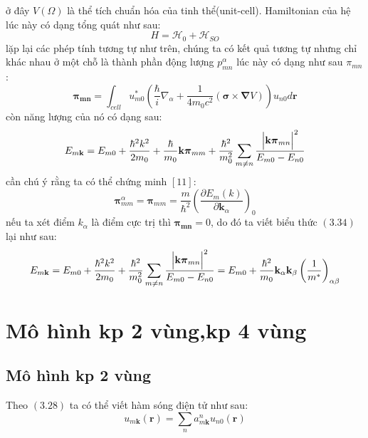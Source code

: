 ở đây $V\left(\Omega\right)$ là thể tích chuẩn hóa của tinh thể(unit-cell). Hamiltonian của hệ lúc này có dạng tổng quát như sau:
\[H=\mathcal{H}_0 +\mathcal{H}_{SO}\]
lặp lại các phép tính tương tự như trên, chúng ta có kết quả tương tự nhưng chỉ khác nhau ở một chỗ là thành phần động lượng $p_{mn}^\alpha$ lúc này có dạng như sau $\pi_{mn}$:
\begin{equation}
\boldsymbol{\pi_{mn}}=\int_{cell} u_{m0}^*\left( \frac{\hbar}{i}\nabla_\alpha + \frac{1}{4m_0c^2} \left(\boldsymbol {\sigma}\times\boldsymbol{ \nabla} V\right)\right)u_{n0}d\mathbf{r}
\end{equation} 
còn năng lượng của nó có dạng sau:
\begin{equation}
 E_{m\mathbf{k}}=E_{m0}+\frac{\hbar^2 k^2}{2m_0}+\frac{\hbar}{m_0}\mathbf{k}\boldsymbol{\pi}_{mm} +\frac{\hbar^2}{m_0^2}\sum_{m \ne n}\frac{{\Bigl\vert\mathbf{k}\boldsymbol{\pi}_{mn} \Bigr\vert}^2}{E_{m0}-E_{n0}}
\end{equation}
cần chú ý rằng ta có thể chứng minh $[11]$:
\begin{equation}
\boldsymbol{\pi}_{mm}^\alpha=\boldsymbol{\pi}_{mm}= \frac{m}{\hbar^2}\left(\frac{\partial E_m\left(k\right)}{\partial \mathbf{k}_\alpha}\right)_0
\end{equation}
nếu ta xét điểm $k_\alpha$ là điểm cực trị thì $\boldsymbol{\pi_{mn}}=0$, do đó ta viết biểu thức $(3.34)$ lại như sau:
\begin{equation}
 E_{m\mathbf{k}}=E_{m0}+\frac{\hbar^2 k^2}{2m_0} +\frac{\hbar^2}{m_0^2}\sum_{m \ne n}\frac{{\Bigl\vert\mathbf{k}\boldsymbol{\pi}_{mn}\Bigl\vert}^2}{E_{m0}-E_{n0}}=E_{m0}+\frac{\hbar^2}{m_0}\mathbf{k_\alpha}\mathbf{k_\beta}\left(\frac{1}{m^*}\right)_{\alpha\beta}
\end{equation}

\section{Mô hình kp 2 vùng,kp 4 vùng}
\subsection{Mô hình kp 2 vùng}
Theo $(3.28)$ ta có thể viết hàm sóng điện tử như sau: 
\begin{equation}
u_{m\mathbf{k}}\left(\mathbf{r}\right) = \sum_n a_{m\mathbf{k}}^nu_{n0}\left(\mathbf{r}\right)
\end{equation}

